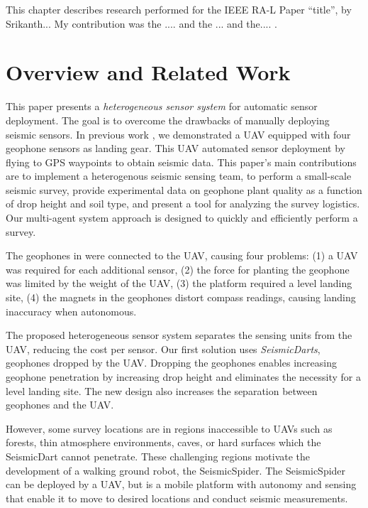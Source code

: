 

This chapter describes research performed for the IEEE RA-L Paper ``title'', by Srikanth...
My contribution was the .... and the ... and the.... .



\section[RelatedWork]{Overview and Related Work}

This paper presents a \emph{heterogeneous sensor system} for automatic sensor deployment. The goal is to overcome the drawbacks of manually deploying seismic sensors. 
In previous work \cite{sudarshan2015using}, we demonstrated a UAV equipped with four geophone sensors as landing gear.
This UAV automated sensor deployment by flying to GPS waypoints to obtain seismic data. 
This paper's main contributions are to implement a heterogenous seismic sensing team, to perform a small-scale seismic survey, provide experimental data on geophone plant quality as a function of drop height and soil type, and present a tool for analyzing the survey logistics.
Our multi-agent system approach is designed to quickly and efficiently perform a survey.

The geophones in  \cite{sudarshan2015using} were connected to the UAV, causing four problems:
(1) a UAV was required for each additional sensor,
(2)  the force for planting the geophone was limited by the weight of the UAV,
(3) the platform required a level landing site,
(4) the magnets in the geophones distort compass readings, causing landing inaccuracy when autonomous.

The proposed heterogeneous sensor system separates the sensing units from the UAV, reducing the cost per sensor. 
Our first solution uses \emph{SeismicDarts}, geophones dropped by the UAV.
Dropping the geophones enables increasing geophone penetration by increasing drop height and eliminates the necessity for a level landing site.
The new design also increases the separation between geophones and the UAV.

However, some survey locations are in regions inaccessible to UAVs such as forests, thin atmosphere environments, caves, or hard surfaces which the SeismicDart cannot penetrate. These challenging regions motivate the development of a walking ground robot, the SeismicSpider. 
 The SeismicSpider can be deployed by a UAV, but is a mobile platform with autonomy and sensing that enable it to move to desired locations and conduct seismic measurements.

